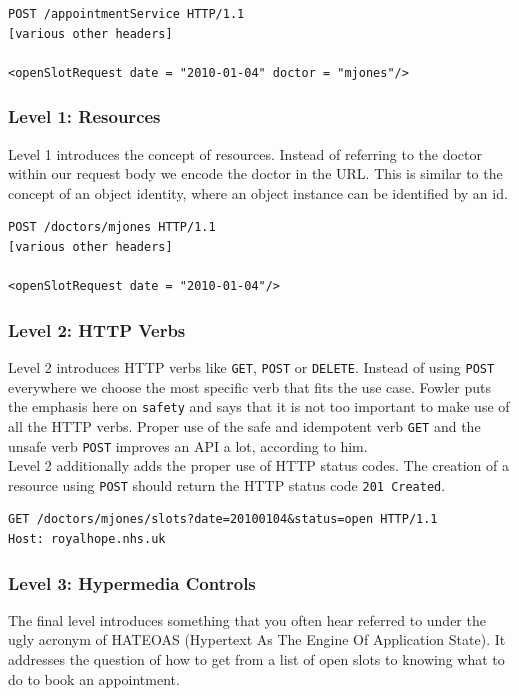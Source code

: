 \lstset{language=XML}
\begin{lstlisting}[caption=Level 0: \gls{remoteprocedurecall} on HTTP]
POST /appointmentService HTTP/1.1
[various other headers]

<openSlotRequest date = "2010-01-04" doctor = "mjones"/>
\end{lstlisting}

\subsubsection{Level 1: Resources}
Level 1 introduces the concept of resources. Instead of referring to the doctor within our request body we encode the doctor in the URL. This is similar to the concept of an object identity, where an object instance can be identified by an id.

\lstset{language=XML}
\begin{lstlisting}[caption=Level 1: Referring to the doctor as a resource.]
POST /doctors/mjones HTTP/1.1
[various other headers]

<openSlotRequest date = "2010-01-04"/>
\end{lstlisting}

\subsubsection{Level 2: HTTP Verbs}
Level 2 introduces HTTP verbs like \lstinline{GET}, \lstinline{POST} or \lstinline{DELETE}. Instead of using \lstinline{POST} everywhere we choose the most specific verb that fits the use case.
Fowler puts the emphasis here on \lstinline{safety} and says that it is not too important to make use of all the HTTP verbs. Proper use of the safe and idempotent verb \lstinline{GET} and the unsafe verb \lstinline{POST} improves an API a lot, according to him. \\
Level 2 additionally adds the proper use of HTTP status codes. The creation of a resource using \lstinline{POST} should return the HTTP status code \lstinline{201 Created}.

\lstset{language=}
\begin{lstlisting}[caption=Level 2: Safely fetching the list of open slots using \lstinline{GET}.]
GET /doctors/mjones/slots?date=20100104&status=open HTTP/1.1
Host: royalhope.nhs.uk
\end{lstlisting}

\subsubsection{Level 3: Hypermedia Controls}
The final level introduces something that you often hear referred to under the ugly acronym of HATEOAS (Hypertext As The Engine Of Application State). It addresses the question of how to get from a list of open slots to knowing what to do to book an appointment. \citep{richardsonmaturitymodel}

